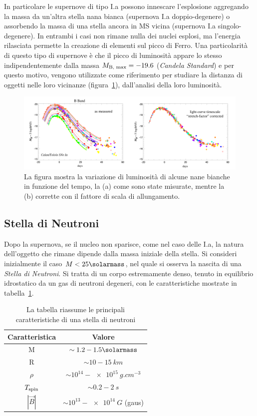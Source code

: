 In particolare le supernove di tipo I.a possono innescare l'esplosione aggregando la massa da un'altra stella nana bianca (supernova I.a doppio-degenere) o assorbendo la massa di una stella ancora in MS vicina (supernova I.a singolo-degenere). In entrambi i casi non rimane nulla dei nuclei esplosi, ma l'energia rilasciata permette la creazione di elementi sul picco di Ferro. Una particolarità di questo tipo di supernove è che il picco di luminosità appare lo stesso indipendentemente dalla massa $M_{\mbox{\scriptsize{B, max}}} = - 19.6$ (\textit{Candela Standard}) e per questo motivo, vengono utilizzate come riferimento per studiare la distanza di oggetti nelle loro vicinanze (figura~\ref{fig:std-candle}), dall'analisi della loro luminosità.

\begin{figure}
    \centering
    \includegraphics[width = \textwidth]{immagini/stretch_hammuy.png}
    \caption{La figura mostra la variazione di luminosità di alcune nane bianche in funzione del tempo, la (a) come sono state misurate, mentre la (b) corrette con il fattore di scala di allungamento.}\label{fig:std-candle}
\end{figure}

\subsection{Stella di Neutroni}\label{sec:stella-neutroni}
Dopo la supernova, se il nucleo non sparisce, come nel caso delle I.a, la natura dell'oggetto che rimane dipende dalla massa iniziale della stella. Si consideri inizialmente il caso $M < 25\si{\solarmass}$, nel quale si osserva la nascita di una \textit{Stella di Neutroni}. Si tratta di un corpo estremamente denso, tenuto in equilibrio idrostatico da un gas di neutroni degeneri, con le caratteristiche mostrate in tabella~\ref{tab:neutron-star}.
\begin{table}
    \centering
    \caption{La tabella riassume le principali caratteristiche di una stella di neutroni}\label{tab:neutron-star}
    \begin{tabular}{c|c}
        \toprule
        Caratteristica & Valore\\
        \midrule
        M&$\sim 1.2 - 1.5 \si{\solarmass}$ \\
        R&$\sim 10 - \SI{15}{km}$ \\
        $\rho$&$\sim 10^{14} - \SI{e15}{g.cm^{-3}}$ \\
        $T_{\mbox{\scriptsize{spin}}}$& $\sim 0.2 - \SI{2}{s}$ \\
        $|\vec{B}|$& $\sim 10^{13} - \SI{e14}{G}$ (gaus)\\
        \bottomrule
    \end{tabular}
\end{table}

